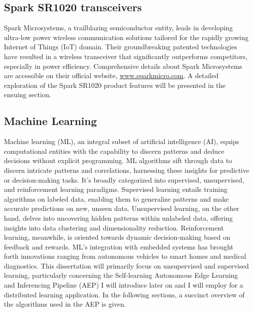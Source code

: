 \subsection{Spark SR1020 transceivers}
\label{spark_sr1020}
Spark Microsystems, a trailblazing semiconductor entity, leads in developing ultra-low power wireless communication solutions tailored for the rapidly growing Internet of Things (IoT) domain. Their groundbreaking patented technologies have resulted in a wireless transceiver that significantly outperforms competitors, especially in power efficiency. Comprehensive details about Spark Microsystems are accessible on their official website, \url{www.sparkmicro.com}. A detailed exploration of the Spark SR1020 product features will be presented in the ensuing section.


\subsection{Machine Learning}
\label{machine_learning}
Machine learning (ML), an integral subset of artificial intelligence (AI), equips computational entities with the capability to discern patterns and deduce decisions without explicit programming. ML algorithms sift through data to discern intricate patterns and correlations, harnessing these insights for predictive or decision-making tasks. It's broadly categorized into supervised, unsupervised, and reinforcement learning paradigms. Supervised learning entails training algorithms on labeled data, enabling them to generalize patterns and make accurate predictions on new, unseen data. Unsupervised learning, on the other hand, delves into uncovering hidden patterns within unlabeled data, offering insights into data clustering and dimensionality reduction. Reinforcement learning, meanwhile, is oriented towards dynamic decision-making based on feedback and rewards\cite{ML_paper}. ML's integration with embedded systems has brought forth innovations ranging from autonomous vehicles to smart homes and medical diagnostics. This dissertation will primarily focus on unsupervised and supervised learning, particularly concerning the Self-learning Autonomous Edge Learning and Inferencing Pipeline (AEP)\cite{AEP_paper} I will introduce later on and I will employ for a distributed learning application. In the following sections, a succinct overview of the algorithms used in the AEP is given.

